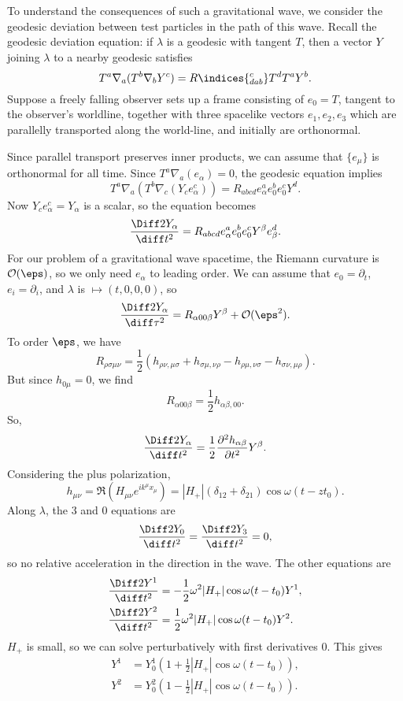 \documentclass[12pt]{article}
\begin{document}
To understand the consequences of such a gravitational wave, we consider the geodesic deviation between test particles in the path of this wave. Recall the geodesic deviation equation: if $\lambda$ is a geodesic with tangent $T$, then a vector $Y$ joining $\lambda$ to a nearby geodesic satisfies
\[
	T^a \nabla_a (T^b \nabla_b Y^c) = R\indices{^{c}_{dab}} T^d T^a Y^b.
\]
Suppose a freely falling observer sets up a frame consisting of $e_0 = T$, tangent to the observer's worldline, together with three spacelike vectors $e_1, e_2, e_3$ which are parallelly transported along the world-line, and initially are orthonormal.

Since parallel transport preserves inner products, we can assume that $\{e_\mu\}$ is orthonormal for all time. Since $T^a \nabla_a (e_\alpha) = 0$, the geodesic equation implies
\[
	T^a \nabla_a(T^b \nabla_c (Y_c e^c_\alpha)) = R_{abcd} e^a_\alpha e^b_0 e^c_0 Y^d.
\]
Now $Y_c e^c_\alpha = Y_\alpha$ is a scalar, so the equation becomes
\[
	\frac{\Diff2 Y_\alpha}{\diff t^2} = R_{abcd} e^a_\alpha e^b_0 e^c_0 Y^{\beta} e^d_\beta.
\]
For our problem of a gravitational wave spacetime, the Riemann curvature is $\mathcal{O}(\eps)$, so we only need $e_\alpha$ to leading order. We can assume that $e_0 = \partial_t$, $e_i = \partial_i$, and  $\lambda$ is $ \mapsto (t, 0, 0, 0)$, so
\[
	\frac{\Diff 2 Y_\alpha}{\diff \tau^2} = R_{\alpha00\beta}Y^\beta + \mathcal{O}(\eps^2).
\]
To order $\eps$, we have
\[
R_{\rho\sigma\mu\nu} = \frac{1}{2} \left( h_{\rho\nu,\mu\sigma} + h_{\sigma\mu,\nu\rho} - h_{\rho\mu,\nu\sigma} - h_{\sigma\nu,\mu\rho}\right).
\]
But since $h_{0\mu} = 0$, we find
\[
R_{\alpha00\beta} = \frac{1}{2} h_{\alpha\beta,00}.
\]
So,
\[
	\frac{\Diff 2 Y_\alpha}{\diff t^2} = \frac 12 \frac{\partial^2 h_{\alpha\beta}}{\partial t^2} Y^\beta.
\]
Considering the plus polarization,
\[
h_{\mu\nu} = \Re (H_{\mu\nu} e^{i k^\mu x_\mu}) = |H_+|(\delta_{12} + \delta_{21}) \cos \omega(t - z t_0).
\]
Along $\lambda$, the 3 and 0 equations are
\[
	\frac{\Diff 2 Y_0}{\diff t^2} = \frac{\Diff 2 Y_3}{\diff t^2} = 0,
\]
so no relative acceleration in the direction in the wave. The other equations are
\begin{align*}
	\frac{\Diff 2 Y^1}{\diff t^2} &= - \frac 12 \omega^2 |H_+| \cos \omega(t - t_0) Y^1, \\
	\frac{\Diff 2 Y^2}{\diff t^2} &= \frac 12 \omega^2 |H_+| \cos \omega(t - t_0) Y^2.
\end{align*}
$H_+$ is small, so we can solve perturbatively with first derivatives $0$. This gives
\begin{align*}
	Y^1 &= Y_0^1 \left( 1 + \frac 12 |H_+| \cos \omega (t - t_0) \right), \\
	Y^2 &= Y_0^2 \left(1 - \frac 12 |H_+| \cos \omega(t - t_0)\right).
\end{align*}
\end{document}
